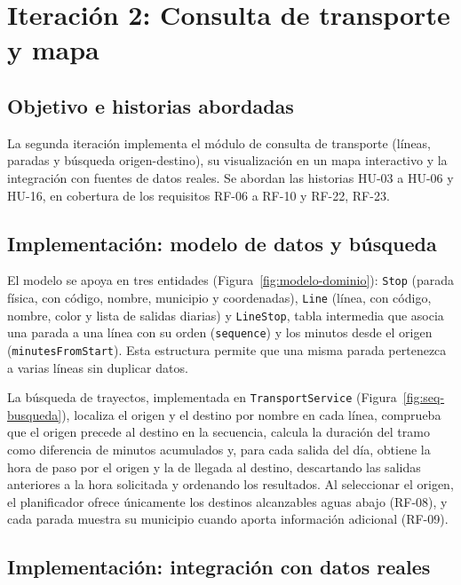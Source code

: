 \section{Iteración 2: Consulta de transporte y mapa}
\label{sec:iteracion-2}

\subsection{Objetivo e historias abordadas}

La segunda iteración implementa el módulo de consulta de transporte (líneas, paradas y búsqueda origen-destino), su visualización en un mapa interactivo y la integración con fuentes de datos reales. Se abordan las historias HU-03 a HU-06 y HU-16, en cobertura de los requisitos RF-06 a RF-10 y RF-22, RF-23.

\subsection{Implementación: modelo de datos y búsqueda}

El modelo se apoya en tres entidades (Figura~\ref{fig:modelo-dominio}): \texttt{Stop} (parada física, con código, nombre, municipio y coordenadas), \texttt{Line} (línea, con código, nombre, color y lista de salidas diarias) y \texttt{LineStop}, tabla intermedia que asocia una parada a una línea con su orden (\texttt{sequence}) y los minutos desde el origen (\texttt{minutesFromStart}). Esta estructura permite que una misma parada pertenezca a varias líneas sin duplicar datos.

La búsqueda de trayectos, implementada en \texttt{TransportService} (Figura~\ref{fig:seq-busqueda}), localiza el origen y el destino por nombre en cada línea, comprueba que el origen precede al destino en la secuencia, calcula la duración del tramo como diferencia de minutos acumulados y, para cada salida del día, obtiene la hora de paso por el origen y la de llegada al destino, descartando las salidas anteriores a la hora solicitada y ordenando los resultados. Al seleccionar el origen, el planificador ofrece únicamente los destinos alcanzables aguas abajo (RF-08), y cada parada muestra su municipio cuando aporta información adicional (RF-09).

\subsection{Implementación: integración con datos reales}


